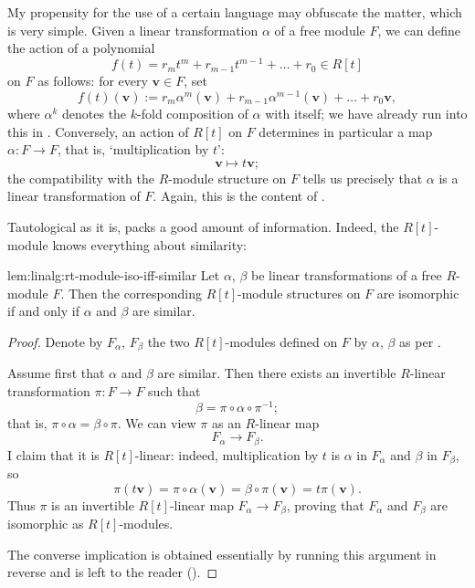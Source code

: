 My propensity for the use of a certain language may obfuscate the
matter, which is very simple. Given a linear transformation $\alpha$
of a free module $F$, we can define the action of a polynomial
\[
  f(t) = r_m t^m + r_{m-1} t^{m-1} + \dots + r_0 \in R[t]
\]
on $F$ as follows: for every $\mathbf{v} \in F$, set
\[
  f(t)(\mathbf{v}) := r_m \alpha^m(\mathbf{v}) + r_{m-1}
  \alpha^{m-1}(\mathbf{v}) + \dots + r_0 \mathbf{v},
\]
where $\alpha^k$ denotes the $k$-fold composition of $\alpha$ with
itself; we have already run into this in
. Conversely,
an action of $R[t]$ on $F$ determines in particular a map
$\alpha : F \to F$, that is, `multiplication by $t$':
\[
  \mathbf{v} \mapsto t\mathbf{v};
\]
the compatibility with the $R$-module structure on $F$ tells us
precisely that $\alpha$ is a linear transformation of $F$. Again, this
is the content of .

Tautological as it is,  packs a good amount of
information. Indeed, the $R[t]$-module knows everything about
similarity:

\begin{lem}{}{lem:linalg:rt-module-iso-iff-similar}
  Let $\alpha$, $\beta$ be linear transformations of a free $R$-module
  $F$. Then the corresponding $R[t]$-module structures on $F$ are
  isomorphic if and only if $\alpha$ and $\beta$ are similar.
\end{lem}

\begin{proof}
  Denote by $F_\alpha$, $F_\beta$ the two $R[t]$-modules defined on
  $F$ by $\alpha$, $\beta$ as per .

  Assume first that $\alpha$ and $\beta$ are similar. Then there
  exists an invertible $R$-linear transformation $\pi : F \to F$ such
  that
  \[
    \beta = \pi \circ \alpha \circ \pi^{-1};
  \]
  that is, $\pi \circ \alpha = \beta \circ \pi$. We can view $\pi$ as
  an $R$-linear map
  \[
    F_\alpha \to F_\beta.
  \]
  I claim that it is $R[t]$-linear: indeed, multiplication by $t$ is
  $\alpha$ in $F_\alpha$ and $\beta$ in $F_\beta$, so
  \[
    \pi(t\mathbf{v}) = \pi \circ \alpha(\mathbf{v}) = \beta \circ
    \pi(\mathbf{v}) = t\pi(\mathbf{v}).
  \]
  Thus $\pi$ is an invertible $R[t]$-linear map
  $F_\alpha \to F_\beta$, proving that $F_\alpha$ and $F_\beta$ are
  isomorphic as $R[t]$-modules.

  The converse implication is obtained essentially by running this
  argument in reverse and is left to the reader
  ().
\end{proof}

